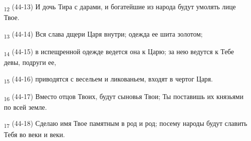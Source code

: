 \begin{tcolorbox}
\textsubscript{12} (44-13) И дочь Тира с дарами, и богатейшие из народа будут умолять лице Твое.
\end{tcolorbox}
\begin{tcolorbox}
\textsubscript{13} (44-14) Вся слава дщери Царя внутри; одежда ее шита золотом;
\end{tcolorbox}
\begin{tcolorbox}
\textsubscript{14} (44-15) в испещренной одежде ведется она к Царю; за нею ведутся к Тебе девы, подруги ее,
\end{tcolorbox}
\begin{tcolorbox}
\textsubscript{15} (44-16) приводятся с весельем и ликованьем, входят в чертог Царя.
\end{tcolorbox}
\begin{tcolorbox}
\textsubscript{16} (44-17) Вместо отцов Твоих, будут сыновья Твои; Ты поставишь их князьями по всей земле.
\end{tcolorbox}
\begin{tcolorbox}
\textsubscript{17} (44-18) Сделаю имя Твое памятным в род и род; посему народы будут славить Тебя во веки и веки.
\end{tcolorbox}
